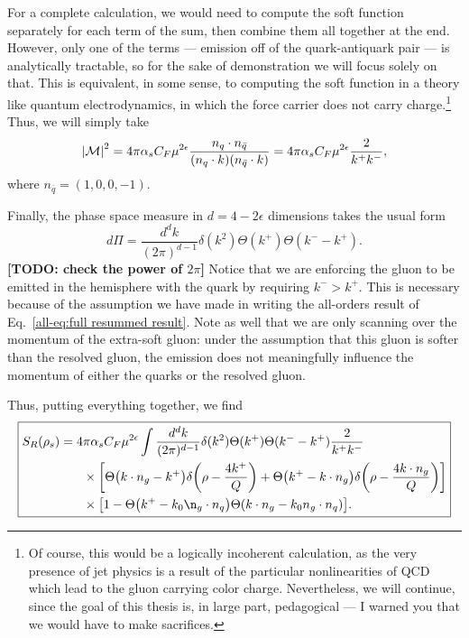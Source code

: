 \documentclass[../thesis.tex]{subfiles}
\providecommand{\cM}{\mathcal{M}}
\begin{document}
	For a complete calculation, we would need to compute the soft function separately for each term of the sum, then combine them all together at the end. However, only one of the terms --- emission off of the quark-antiquark pair --- is analytically tractable, so for the sake of demonstration we will focus solely on that. This is equivalent, in some sense, to computing the soft function in a theory like quantum electrodynamics, in which the force carrier does not carry charge.\footnote{Of course, this would be a logically incoherent calculation, as the very presence of jet physics is a result of the particular nonlinearities of QCD which lead to the gluon carrying color charge. Nevertheless, we will continue, since the goal of this thesis is, in large part, pedagogical --- I warned you that we would have to make sacrifices.} Thus, we will simply take
	\begin{equation}
		\abs{\cM}^2 = 4\pi\alpha_s C_F \mu^{2\epsilon} \frac{n_q \cdot n_{\bar q}}{(n_q \cdot k) (n_{\bar q} \cdot k)} = 4\pi\alpha_s C_F \mu^{2\epsilon} \frac{2}{k^+ k^-},
	\end{equation}
	where $n_{\bar q} = (1, 0, 0, -1)$.

	Finally, the phase space measure in $d = 4 - 2\epsilon$ dimensions takes the usual form
	\begin{equation}
		d\Pi = \frac{d^d k}{(2 \pi)^{d - 1}} \delta(k^2) \Theta(k^+) \Theta(k^- - k^+).
	\end{equation}
	{\color{red}\textbf{[TODO: check the power of $2\pi$]}} Notice that we are enforcing the gluon to be emitted in the hemisphere with the quark by requiring $k^- > k^+$. This is necessary because of the assumption we have made in writing the all-orders result of Eq.~\ref{all-eq:full resummed result}. Note as well that we are only scanning over the momentum of the extra-soft gluon: under the assumption that this gluon is softer than the resolved gluon, the emission does not meaningfully influence the momentum of either the quarks or the resolved gluon.

	Thus, putting everything together, we find
	\begin{equation}\label{all-eq:soft function general coords}
	\boxed{
	\begin{aligned}
		S_R(\rho_s) = 4&\pi\alpha_s C_F \mu^{2\epsilon} \int \frac{d^d k}{(2\pi)^{d - 1}} \delta(k^2) \Theta(k^+) \Theta(k^- - k^+) \frac{2}{k^+ k^-} \\
		&\times \qty[\Theta\qty(k \cdot n_g - k^+) \delta\qty(\rho - \frac{4 k^+}{Q}) + \Theta\qty(k^+ - k \cdot n_g) \delta\qty(\rho - \frac{4 k \cdot n_g}{Q})] \\
		&\times \qty[1 - \Theta\qty(k^+ - k_0 \n_g \cdot n_q) \Theta(k\cdot n_g - k_0 n_g \cdot n_q)].
	\end{aligned}
	}
	\end{equation}
\end{document}
